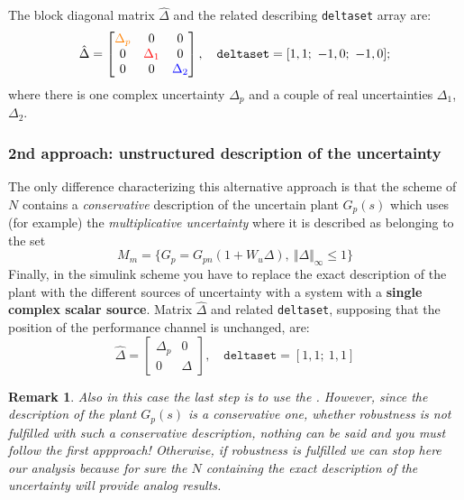 \documentclass[a4paper, 12pt]{article}
\newtheorem*{remark}{Remark}
\begin{document}
\noindent
The block diagonal matrix $\hat{\Delta}$ and the related describing \texttt{deltaset} array are:
\begin{equation*}
    \hat{\Delta}=\begin{bmatrix}
        {\color{orange}\Delta_p}&0&0\\
        0&{\color{red}\Delta_1}&0\\
        0&0&{\color{blue}\Delta_2}
    \end{bmatrix}, \quad 
    \texttt{deltaset}=[1,1; \ -1,0; \ -1,0];
\end{equation*}
where there is one complex uncertainty $\Delta_p$ and a couple of real uncertainties $\Delta_1$, $\Delta_2$.

\subsubsection{2nd approach: unstructured description of the uncertainty}
The only difference characterizing this alternative approach is that the scheme of $N$ contains a \textit{conservative} description of the uncertain plant $G_p(s)$ which uses (for example) the  \textit{multiplicative uncertainty} where it is described as belonging to the set
\begin{equation}
    M_m=\{
        G_p=G_{pn}(1+W_u\Delta), \ \Vert \Delta \Vert_\infty \le 1
    \}
\end{equation}
Finally, in the simulink scheme you have to replace the exact description of the plant with the different sources of uncertainty with a system with a \textbf{single complex scalar source}. Matrix $\hat{\Delta}$ and related \texttt{deltaset}, supposing that the position of the performance channel is unchanged, are: 
\begin{equation*}
    \hat{\Delta}=\begin{bmatrix}
        \Delta_p&0\\
        0&\Delta
    \end{bmatrix}, \quad
    \texttt{deltaset}=[1, 1; \ 1,1 ]
\end{equation*}

\noindent
\begin{remark}
    Also in this case the last step is to use the . However, since the description of the plant $G_p(s)$ is a conservative one, whether robustness is not fulfilled with such a conservative description, nothing can be said and you must follow the first appproach! Otherwise, if robustness is fulfilled we can stop here our analysis because for sure the $N$ containing the exact description of the uncertainty will provide analog results. 
\end{remark}
\end{document}
